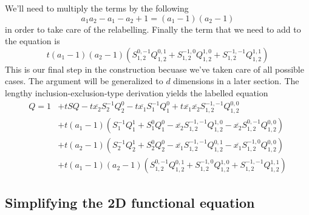 \documentclass[12pt]{article}
\theoremstyle{definition} \newtheorem{definition}[theorem]{Definition}
\newcommand{\ol}[1]{\overline{#1}}
\newcommand{\Q}[2]{Q_{#1}^{#2}}
\newcommand{\Qf}[1]{Q_{1,2}^{#1}}
\newcommand{\es}[2]{S_{#1}^{#2}}
\newcommand{\Sf}[1]{S_{1,2}^{#1}}
\begin{document}
We'll need to multiply the terms by the following
\[
	 a_1a_2-a_1-a_2+1 = (a_1-1)(a_2-1)
\]
in order to take care of the relabelling. Finally the term that we need to add to the equation is
\[
	t(a_1-1)(a_2-1)(\Sf{0,-1}\Qf{0,1}+\Sf{-1,0}\Qf{1,0}+\Sf{-1,-1}\Qf{1,1}) 
\]
This is our final step in the construction becuase we've taken care of all possible cases. The argument will be generalized to $d$ dimensions in a later section. The lengthy inclusion-exclusion-type derivation yields the labelled equation
\begin{align*}
Q = 1 &+ tSQ - t \ol{x_2}\es{2}{-1}\Q{2}{0} - t\ol{x_1}\es{1}{-1}\Q{1}{0}+t\ol{x_1}\ol{x_2}\Sf{-1,-1}\Qf{0,0}\\
	&+ t(a_1-1)(\es{1}{-1}\Q{1}{1}+\es{1}{0}\Q{1}{0}-\ol{x_2}\Sf{-1,-1}\Qf{1,0}-\ol{x_2}\Sf{0,-1}\Qf{0,0})\\
	&+ t(a_2-1)(\es{2}{-1}\Q{2}{1}+\es{2}{0}\Q{2}{0}-\ol{x_1}\Sf{-1,-1}\Qf{0,1}-\ol{x_1}\Sf{-1,0}\Qf{0,0})\\
	&+t(a_1-1)(a_2-1)(\Sf{0,-1}\Qf{0,1}+\Sf{-1,0}\Qf{1,0}+\Sf{-1,-1}\Qf{1,1})
\end{align*}

\subsection{Simplifying the 2D functional equation}
\end{document}
